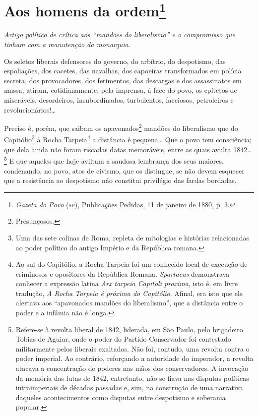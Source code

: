 \chapter{Aos homens da ordem\footnote{\emph{Gazeta do Povo}
  (\textsc{sp}), Publicações Pedidas, 11 de janeiro de 1880, p. 3.}}

\begin{resumo}
\emph{Artigo político de crítica aos ``mandões do liberalismo'' e o
compromisso que tinham com a manutenção da monarquia.}
\end{resumo}


Os seletos liberais defensores do governo, do arbítrio, do despotismo,
das espoliações, dos cacetes, das navalhas, dos capoeiras transformados
em polícia secreta, dos provocadores, dos ferimentos, das descargas e
dos assassinatos em massa, atiram, cotidianamente, pela imprensa, à face
do povo, os epítetos de miseráveis, desordeiros, insubordinados,
turbulentos, facciosos, petroleiros e revolucionários!\ldots{}

Preciso é, porém, que saibam os apavonados\footnote{Presunçosos.}
mandões do liberalismo que do Capitólio\footnote{Uma das sete colinas
  de Roma, repleta de mitologias e histórias relacionadas ao poder
  político do antigo Império e da República romana.} à Rocha
Tarpeia\footnote{Ao sul do Capitólio, a Rocha Tarpeia foi um conhecido
  local de execução de criminosos e opositores da República Romana.
  \emph{Spartacus} demonstrava conhecer a expressão latina \emph{Arx
  tarpeia Capitoli proxima}, isto é, em livre tradução, \emph{A Rocha
  Tarpeia é próxima do Capitólio}. Afinal, era isto que ele alertava aos
  ``apavonados mandões do liberalismo'', que a distância entre o poder e a
  infâmia não é longa.} a distância é pequena\ldots{} Que o povo tem
consciência; que dela ainda não foram riscadas datas memoráveis, entre
as quais avulta 1842\ldots{}\footnote{Refere-se à revolta liberal de 1842,
  liderada, em São Paulo, pelo brigadeiro Tobias de Aguiar, onde o poder
  do Partido Conservador foi contestado militarmente pelos liberais
  exaltados. Não foi, contudo, uma revolta contra o poder imperial. Ao
  contrário, reforçando a autoridade do imperador, a revolta atacava a
  concentração de poderes nas mãos dos conservadores. A invocação da
  memória das lutas de 1842, entretanto, não se fiava nas disputas
  políticas intraimperiais de décadas passadas e, sim, na construção de
  uma narrativa daqueles acontecimentos como disputas entre despotismo e
  soberania popular.} E que
aqueles que hoje aviltam a saudosa lembrança dos seus maiores,
condenando, no povo, atos de civismo, que os distingue, se não devem
esquecer que a resistência ao despotismo não constitui privilégio das
fardas bordadas.

